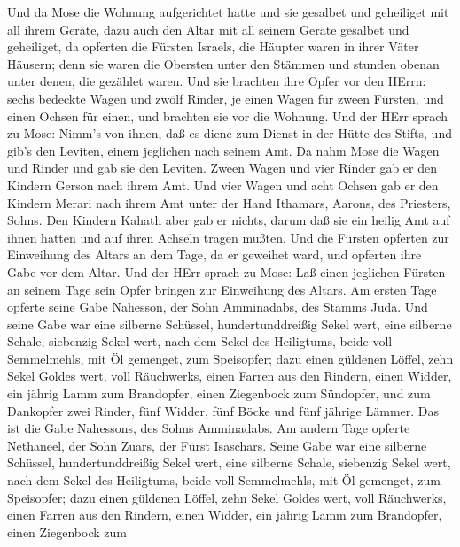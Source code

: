  Und da Mose die Wohnung aufgerichtet hatte und sie gesalbet
und geheiliget mit all ihrem Geräte, dazu auch den Altar mit all seinem
Geräte gesalbet und geheiliget,  da opferten die Fürsten
Israels, die Häupter waren in ihrer Väter Häusern; denn sie waren die
Obersten unter den Stämmen und stunden obenan unter denen, die gezählet
waren.  Und sie brachten ihre Opfer vor den HErrn: sechs
bedeckte Wagen und zwölf Rinder, je einen Wagen für zween Fürsten, und
einen Ochsen für einen, und brachten sie vor die Wohnung. 
Und der HErr sprach zu Mose:  Nimm's von ihnen, daß es diene
zum Dienst in der Hütte des Stifts, und gib's den Leviten, einem
jeglichen nach seinem Amt.  Da nahm Mose die Wagen und
Rinder und gab sie den Leviten.  Zween Wagen und vier Rinder
gab er den Kindern Gerson nach ihrem Amt.  Und vier Wagen
und acht Ochsen gab er den Kindern Merari nach ihrem Amt unter der Hand
Ithamars, Aarons, des Priesters, Sohns.  Den Kindern Kahath
aber gab er nichts, darum daß sie ein heilig Amt auf ihnen hatten und
auf ihren Achseln tragen mußten.  Und die Fürsten opferten
zur Einweihung des Altars an dem Tage, da er geweihet ward, und opferten
ihre Gabe vor dem Altar.  Und der HErr sprach zu Mose: Laß
einen jeglichen Fürsten an seinem Tage sein Opfer bringen zur Einweihung
des Altars.  Am ersten Tage opferte seine Gabe Nahesson,
der Sohn Amminadabs, des Stamms Juda.  Und seine Gabe war
eine silberne Schüssel, hundertunddreißig Sekel wert, eine silberne
Schale, siebenzig Sekel wert, nach dem Sekel des Heiligtums, beide voll
Semmelmehls, mit Öl gemenget, zum Speisopfer;  dazu einen
güldenen Löffel, zehn Sekel Goldes wert, voll Räuchwerks, 
einen Farren aus den Rindern, einen Widder, ein jährig Lamm zum
Brandopfer,  einen Ziegenbock zum Sündopfer, 
und zum Dankopfer zwei Rinder, fünf Widder, fünf Böcke und fünf jährige
Lämmer. Das ist die Gabe Nahessons, des Sohns Amminadabs. 
Am andern Tage opferte Nethaneel, der Sohn Zuars, der Fürst Isaschars.
 Seine Gabe war eine silberne Schüssel, hundertunddreißig
Sekel wert, eine silberne Schale, siebenzig Sekel wert, nach dem Sekel
des Heiligtums, beide voll Semmelmehls, mit Öl gemenget, zum Speisopfer;
 dazu einen güldenen Löffel, zehn Sekel Goldes wert, voll
Räuchwerks,  einen Farren aus den Rindern, einen Widder,
ein jährig Lamm zum Brandopfer,  einen Ziegenbock zum
